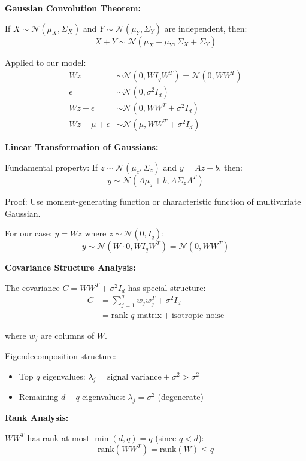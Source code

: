 \documentclass[12pt]{article}
\begin{document}
\begin{explanation}

\textbf{Gaussian Convolution Theorem:}

If $X \sim \mathcal{N}(\mu_X, \Sigma_X)$ and $Y \sim \mathcal{N}(\mu_Y, \Sigma_Y)$ are independent, then:
\[
X + Y \sim \mathcal{N}(\mu_X + \mu_Y, \Sigma_X + \Sigma_Y)
\]

Applied to our model:
\begin{align*}
Wz &\sim \mathcal{N}(0, WI_qW^T) = \mathcal{N}(0, WW^T) \\
\epsilon &\sim \mathcal{N}(0, \sigma^2 I_d) \\
Wz + \epsilon &\sim \mathcal{N}(0, WW^T + \sigma^2 I_d) \\
Wz + \mu + \epsilon &\sim \mathcal{N}(\mu, WW^T + \sigma^2 I_d)
\end{align*}

\textbf{Linear Transformation of Gaussians:}

Fundamental property: If $z \sim \mathcal{N}(\mu_z, \Sigma_z)$ and $y = Az + b$, then:
\[
y \sim \mathcal{N}(A\mu_z + b, A\Sigma_z A^T)
\]

Proof: Use moment-generating function or characteristic function of multivariate Gaussian.

For our case: $y = Wz$ where $z \sim \mathcal{N}(0, I_q)$:
\[
y \sim \mathcal{N}(W \cdot 0, W I_q W^T) = \mathcal{N}(0, WW^T)
\]

\textbf{Covariance Structure Analysis:}

The covariance $C = WW^T + \sigma^2 I_d$ has special structure:
\begin{align*}
C &= \sum_{j=1}^q w_j w_j^T + \sigma^2 I_d \\
&= \text{rank-}q \text{ matrix} + \text{isotropic noise}
\end{align*}

where $w_j$ are columns of $W$.

Eigendecomposition structure:
\begin{itemize}
    \item Top $q$ eigenvalues: $\lambda_j = \text{signal variance} + \sigma^2 > \sigma^2$
    \item Remaining $d-q$ eigenvalues: $\lambda_j = \sigma^2$ (degenerate)
\end{itemize}

\textbf{Rank Analysis:}

$WW^T$ has rank at most $\min(d, q) = q$ (since $q < d$):
\[
\text{rank}(WW^T) = \text{rank}(W) \leq q
\]


\end{explanation}
\end{document}
